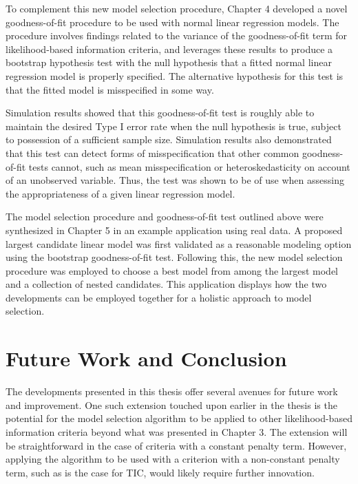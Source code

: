 		To complement this new model selection procedure, Chapter 4 developed a novel goodness-of-fit procedure to be used with normal linear regression models.
		The procedure involves findings related to the variance of the goodness-of-fit term for likelihood-based information criteria, and leverages these
		results to produce a bootstrap hypothesis test with the null hypothesis that a fitted normal linear regression model is properly specified. The alternative
		hypothesis for this test is that the fitted model is misspecified in some way.

		Simulation results showed that this goodness-of-fit test is roughly able to maintain the desired Type I error rate when the null hypothesis is true, subject
		to possession of a sufficient sample size. Simulation results also demonstrated that this test can detect forms of misspecification that other common
		goodness-of-fit tests cannot, such as mean misspecification or heteroskedasticity on account of an unobserved variable. Thus, the test was shown to be of use
		when assessing the appropriateness of a given linear regression model.

		The model selection procedure and goodness-of-fit test outlined above were synthesized in Chapter 5 in an example application using real data. A proposed
		largest candidate linear model was first validated as a reasonable modeling option using the bootstrap goodness-of-fit test. Following this, the new model selection
		procedure was employed to choose a best model from among the largest model and a collection of nested candidates. This application displays how the
		two developments can be employed together for a holistic approach to model selection.

		\section{Future Work and Conclusion}

		The developments presented in this thesis offer several avenues for future work and improvement. One such extension touched upon earlier in the thesis is the
		potential for the model selection algorithm to be applied to other likelihood-based information criteria beyond what was presented in Chapter 3. The extension
		will be straightforward in the case of criteria with a constant penalty term. However, applying the algorithm to be used with a criterion with a non-constant penalty term,
		such as is the case for TIC, would likely require further innovation.

